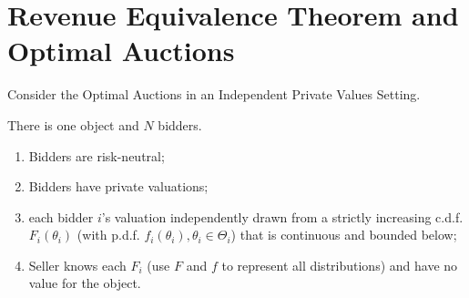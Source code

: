 \documentclass[11pt]{elegantbook_2}
\begin{document}
\section{Revenue Equivalence Theorem and Optimal Auctions}
Consider the Optimal Auctions in an Independent Private Values Setting.
\begin{assumption}\label{IPV:assumption}
    There is one object and $N$ bidders.
    \begin{enumerate}
        \item Bidders are risk-neutral;
        \item Bidders have private valuations;
        \item each bidder $i$'s valuation independently drawn from a strictly increasing c.d.f. $F_i(\theta_i)$ (with p.d.f. $f_i(\theta_i),\theta_i\in \Theta_i$) that is continuous and bounded below;
        \item Seller knows each $F_i$ (use $F$ and $f$ to represent all distributions) and have no value for the object.
    \end{enumerate}
\end{assumption}
\end{document}
